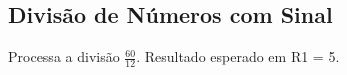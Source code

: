 \documentclass[12pt]{article}
\begin{document}



\subsection{Divisão de Números com Sinal}\label{sec:programs:div}

Processa a divisão $\frac{60}{12}$. Resultado esperado em R1 = 5.
\end{document}
